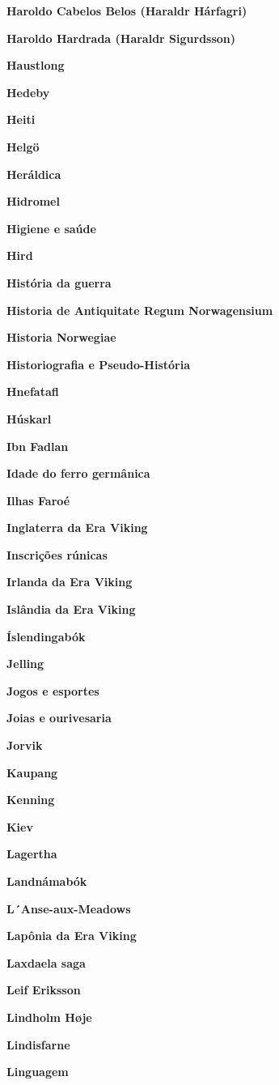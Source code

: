 \textbf{Haroldo Cabelos Belos (Haraldr Hárfagri)}

\textbf{Haroldo Hardrada (Haraldr Sigurdsson)}

\textbf{Haustlong}

\textbf{Hedeby}

\textbf{Heiti}

\textbf{Helgö}

\textbf{Heráldica}

\textbf{Hidromel}

\textbf{Higiene e saúde}

\textbf{Hird}

\textbf{História da guerra}

\textbf{Historia de Antiquitate Regum Norwagensium}

\textbf{Historia Norwegiae}

\textbf{Historiografia e Pseudo-História}

\textbf{Hnefatafl}

\textbf{Húskarl}

\textbf{Ibn Fadlan}

\textbf{Idade do ferro germânica}

\textbf{Ilhas Faroé}

\textbf{Inglaterra da Era Viking}

\textbf{Inscrições rúnicas}

\textbf{Irlanda da Era Viking}

\textbf{Islândia da Era Viking}

\textbf{Íslendingabók}

\textbf{Jelling}

\textbf{Jogos e esportes}

\textbf{Joias e ourivesaria}

\textbf{Jorvik}

\textbf{Kaupang}

\textbf{Kenning}

\textbf{Kiev}

\textbf{Lagertha}

\textbf{Landnámabók}

\textbf{L´Anse-aux-Meadows}

\textbf{Lapônia da Era Viking}

\textbf{Laxdaela saga}

\textbf{Leif Eriksson}

\textbf{Lindholm Høje}

\textbf{Lindisfarne}

\textbf{Linguagem}

